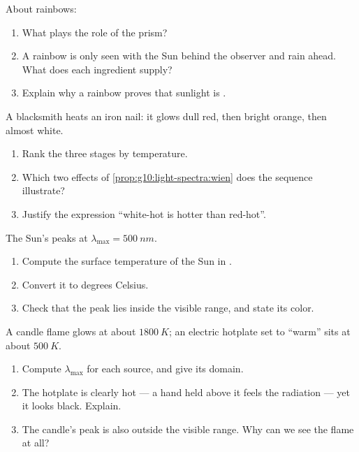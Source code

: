 \begin{exercise}[$\star$]\label{exo:g10:light-spectra:4}
About rainbows:
\begin{enumerate}
  \item What plays the role of the prism?
  \item A rainbow is only seen with the Sun behind the observer and rain
        ahead. What does each ingredient supply?
  \item Explain why a rainbow proves that sunlight is .
\end{enumerate}
\end{exercise}

\begin{exercise}[$\star$]\label{exo:g10:light-spectra:5}
A blacksmith heats an iron nail: it glows dull red, then bright orange,
then almost white.
\begin{enumerate}
  \item Rank the three stages by temperature.
  \item Which two effects of \cref{prop:g10:light-spectra:wien} does the
        sequence illustrate?
  \item Justify the expression ``white-hot is hotter than red-hot''.
\end{enumerate}
\end{exercise}

\begin{exercise}[$\star\star$]\label{exo:g10:light-spectra:6}
The Sun's  peaks at $\lambda_{\max} = \qty{500}{nm}$.
\begin{enumerate}
  \item Compute the surface temperature of the Sun in .
  \item Convert it to degrees Celsius.
  \item Check that the peak lies inside the visible range, and state its
        color.
\end{enumerate}
\end{exercise}

\begin{exercise}[$\star\star$]\label{exo:g10:light-spectra:7}
A candle flame glows at about $\qty{1800}{K}$; an electric hotplate set
to ``warm'' sits at about $\qty{500}{K}$.
\begin{enumerate}
  \item Compute $\lambda_{\max}$ for each source, and give its domain.
  \item The hotplate is clearly hot --- a hand held above it feels the
        radiation --- yet it looks black. Explain.
  \item The candle's peak is also outside the visible range. Why can we
        see the flame at all?
\end{enumerate}
\end{exercise}

